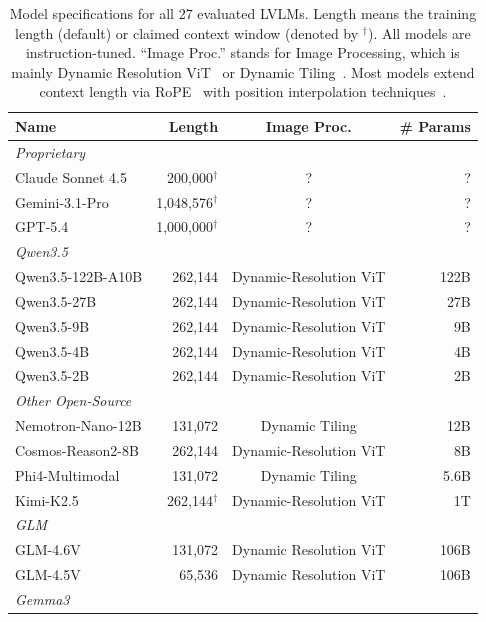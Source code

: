 \documentclass{article}
\begin{document}
\begin{table}[h]
    \caption{
        Model specifications for all 27 evaluated LVLMs. Length means the training length (default) or claimed context window (denoted by $^\dagger$). All models are instruction-tuned. ``Image Proc.'' stands for Image Processing, which is mainly Dynamic Resolution ViT~\citep{wang2024qwen2} or Dynamic Tiling~\citep{wu2024deepseek}. Most models extend context length via RoPE~\citep{su2024roformer} with position interpolation techniques~\citep{chen2023extending,ding2024longrope,pengyarn}.
    }
\label{tab:new_model_list}
\centering
\small
\begin{tabular}{lrcr}
\toprule
\textbf{Name} & \textbf{Length} & \textbf{Image Proc.} & \textbf{\# Params} \\
\midrule
\multicolumn{4}{l}{\textit{Proprietary}} \\
\midrule
Claude Sonnet 4.5 & 200,000$^\dagger$ & ? & ? \\
Gemini-3.1-Pro & 1,048,576$^\dagger$ & ? & ? \\
GPT-5.4 & 1,000,000$^\dagger$ & ? & ? \\
\midrule
\multicolumn{4}{l}{\textit{Qwen3.5}} \\
\midrule
Qwen3.5-122B-A10B & 262,144 & Dynamic-Resolution ViT & 122B \\
Qwen3.5-27B & 262,144 & Dynamic-Resolution ViT & 27B \\
Qwen3.5-9B & 262,144 & Dynamic-Resolution ViT & 9B \\
Qwen3.5-4B & 262,144 & Dynamic-Resolution ViT & 4B \\
Qwen3.5-2B & 262,144 & Dynamic-Resolution ViT & 2B \\
\midrule
\multicolumn{4}{l}{\textit{Other Open-Source}} \\
\midrule
Nemotron-Nano-12B & 131,072 & Dynamic Tiling & 12B \\
Cosmos-Reason2-8B & 262,144 & Dynamic-Resolution ViT & 8B \\
Phi4-Multimodal & 131,072 & Dynamic Tiling & 5.6B \\
Kimi-K2.5 & 262,144$^\dagger$ & Dynamic-Resolution ViT & 1T \\
\midrule
\multicolumn{4}{l}{\textit{GLM}} \\
\midrule
GLM-4.6V & 131,072 & Dynamic Resolution ViT & 106B \\
GLM-4.5V & 65,536 & Dynamic Resolution ViT & 106B \\
\midrule
\multicolumn{4}{l}{\textit{Gemma3}} \\

\end{tabular}
\end{table}
\end{document}
